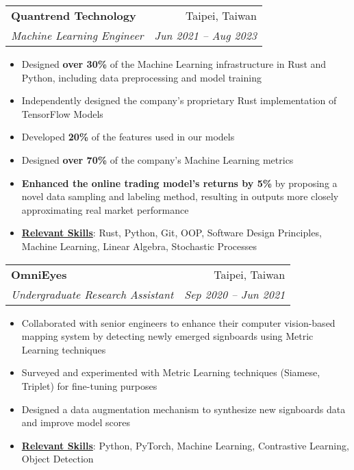 \documentclass[letterpaper,11pt]{article}
\makeatletter
\newcommand{\resumeItem}[1]{
\item\small{
    {#1 \vspace{-2pt}}
  }
}
\newcommand{\resumeSubheading}[4]{
  \vspace{-2pt}
\item
  \begin{tabular*}{0.97\textwidth}[t]{l@{\extracolsep{\fill}}r}
    \textbf{#1} & #2 \\
    \textit{\small#3} & \textit{\small #4} \\
  \end{tabular*}\vspace{-7pt}
}
\newcommand{\resumeSubSubheading}[2]{
\item
  \begin{tabular*}{0.97\textwidth}{l@{\extracolsep{\fill}}r}
    \textit{\small#1} & \textit{\small #2} \\
  \end{tabular*}\vspace{-7pt}
}
\newcommand{\resumeSubHeadingListEnd}{
  \end{itemize}}
\newcommand{\resumeItemListStart}{
\begin{itemize}}
\newcommand{\resumeItemListEnd}{
  \end{itemize}\vspace{-5pt}}
\makeatother
\begin{document}


\resumeSubheading
{Quantrend Technology}{Taipei, Taiwan}
{Machine Learning Engineer}{Jun 2021 -- Aug 2023}
\resumeItemListStart
\resumeItem{Designed \textbf{over 30\%} of the Machine Learning
  infrastructure in Rust and Python, including data preprocessing and
model training}
\resumeItem{Independently designed the company's proprietary Rust
implementation of TensorFlow Models}
\resumeItem{Developed \textbf{20\%} of the features used in our models}
\resumeItem{Designed \textbf{over 70\%} of the company's Machine
Learning metrics}
\resumeItem{\textbf{Enhanced the online trading model's returns by
  5\%} by proposing a novel data sampling and labeling method, resulting
in outputs more closely approximating real market performance}
\resumeItem{\textbf{\underline{Relevant Skills}}:
  Rust, Python, Git, OOP, Software Design Principles, Machine
  Learning, Linear Algebra, Stochastic Processes
}
\resumeItemListEnd

\resumeSubheading
{OmniEyes}{Taipei, Taiwan}
{Undergraduate Research Assistant}{Sep 2020 -- Jun 2021}
\resumeItemListStart
\resumeItem{Collaborated with senior engineers to enhance their
  computer vision-based mapping system by detecting newly emerged
signboards using Metric Learning techniques}
\resumeItem{Surveyed and experimented with Metric Learning techniques
(Siamese, Triplet) for fine-tuning purposes}
\resumeItem{Designed a data augmentation mechanism to synthesize new
signboards data and improve model scores}
\resumeItem{\textbf{\underline{Relevant Skills}}:
  Python, PyTorch, Machine Learning, Contrastive Learning, Object Detection
}
\resumeItemListEnd
\end{document}
